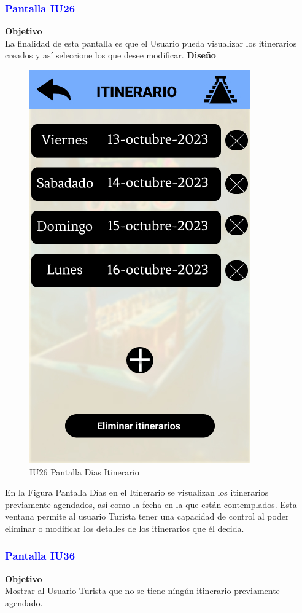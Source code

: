 \subsubsection{\textcolor{blue}{Pantalla IU26}}
\textbf{Objetivo} \\
La finalidad de esta pantalla es que el Usuario pueda visualizar los itinerarios creados y así seleccione los que desee modificar.
\vspace{15pt}
\textbf{Diseño}
\begin{figure}[h]
    \centering 
        \includegraphics[width=.5\linewidth]{Pantallas Prototipo3/IU26 Pantalla Dias Itinerario.jpg}
        \caption{IU26 Pantalla Dias Itinerario}
\end{figure}
  
En la Figura Pantalla Días en el Itinerario se visualizan los itinerarios previamente agendados, así como la fecha en la que están contemplados. Esta ventana permite al usuario Turista tener una capacidad de control al poder eliminar o modificar los detalles de los itinerarios que él decida.
\newpage

\subsubsection{\textcolor{blue}{Pantalla IU36}}

\textbf{Objetivo} \\
Mostrar al Usuario Turista que no se tiene níngún itinerario previamente agendado.
\vspace{15pt}


